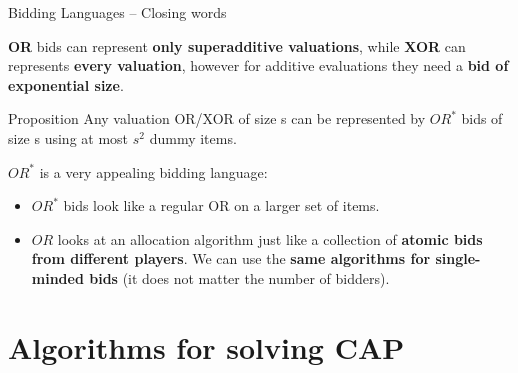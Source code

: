 \documentclass[aspectratio=169,xcolor=dvipsnames]{beamer}
\begin{document}
    \begin{frame}{Bidding Languages – Closing words}

    \textbf{OR} bids can represent \textbf{only superadditive valuations}, while \textbf{XOR} can represents \textbf{every valuation}, however for additive evaluations they need a \textbf{bid of exponential size}.
\pause
    \begin{block}{Proposition}
    Any valuation OR/XOR of size s can be represented by $OR^*$ bids of size s using at most $s^2$ dummy items.
    \end{block}
\pause
    $OR^*$ is a very appealing bidding language:
    \begin{itemize}
    \item $OR^*$ bids look like a regular OR on a larger set of items.
\pause
    \item $OR$ looks at an allocation algorithm just like a collection of \textbf{atomic bids from different players}. We can use the \textbf{same algorithms for single-minded bids} (it does not matter the number of bidders).
    \end{itemize}

\end{frame}



    \section{Algorithms for solving CAP}
\end{document}
